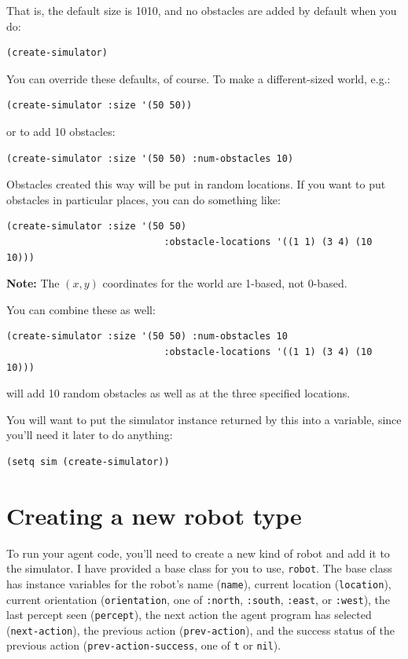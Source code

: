 \documentclass[11pt]{tufte-handout}
\begin{document}
\noindent That is, the default size is 10\texttimes{}10, and no obstacles are added by default when you do:
\begin{verbatim}
(create-simulator)
\end{verbatim}

\noindent You can override these defaults, of course.  To make a different-sized world, e.g.:
\begin{verbatim}
(create-simulator :size '(50 50))
\end{verbatim}

\noindent or to add 10 obstacles:
\begin{verbatim}
(create-simulator :size '(50 50) :num-obstacles 10)
\end{verbatim}


Obstacles created this way will be put in random locations.  If you want to put obstacles in particular places, you can do something like:
\begin{verbatim}
(create-simulator :size '(50 50) 
                            :obstacle-locations '((1 1) (3 4) (10 10)))
\end{verbatim}

\noindent \textbf{Note:} The \((x,y)\) coordinates for the world are 1-based, not 0-based.

You can combine these as well:
\begin{verbatim}
(create-simulator :size '(50 50) :num-obstacles 10 
                            :obstacle-locations '((1 1) (3 4) (10 10)))
\end{verbatim}

\noindent will add 10 random obstacles as well as at the three specified locations.

You will want to put the simulator instance returned by this into a variable, since you'll need it later to do anything:
\begin{verbatim}
(setq sim (create-simulator))
\end{verbatim}

\section{Creating a new robot type}
\label{sec:org9304733}

To run your agent code, you'll need to create a new kind of robot and add it to the simulator.  I have provided a base class for you to use, \texttt{robot}.  The base class has instance variables for the robot's name (\texttt{name}), current location (\texttt{location}), current orientation (\texttt{orientation}, one of \texttt{:north}, \texttt{:south}, \texttt{:east}, or \texttt{:west}), the last percept seen (\texttt{percept}), the next action the agent program has selected (\texttt{next-action}), the previous action (\texttt{prev-action}), and the success status of the previous action (\texttt{prev-action-success}, one of \texttt{t} or \texttt{nil}).
\end{document}
